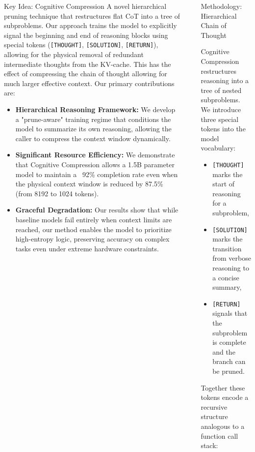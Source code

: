 \documentclass[final]{beamer}
\newlength{\sepwidth}
\newlength{\colwidth}
\newcommand{\separatorcolumn}{\begin{column}{\sepwidth}\end{column}}
\begin{document}
\begin{frame}[t]
\begin{columns}[t]
\begin{column}{\colwidth}
\begin{alertblock}{Key Idea: Cognitive Compression}
    A novel hierarchical pruning technique that restructures flat CoT into a tree of subproblems.
    Our approach trains the model to explicitly signal the beginning and end of reasoning blocks using special tokens (\texttt{[THOUGHT]}, \texttt{[SOLUTION]}, \texttt{[RETURN]}), allowing for the physical removal of redundant intermediate thoughts from the KV-cache. This has the effect of compressing the chain of thought allowing for much larger effective context.
    Our primary contributions are:
    \begin{itemize}
        \item \textbf{Hierarchical Reasoning Framework:} We develop a "prune-aware" training regime that conditions the model to summarize its own reasoning, allowing the caller to compress the context window dynamically.
        \item \textbf{Significant Resource Efficiency:} We demonstrate that Cognitive Compression allows a 1.5B parameter model to maintain a ~92\% completion rate even when the physical context window is reduced by 87.5\% (from 8192 to 1024 tokens).
        \item \textbf{Graceful Degradation:} Our results show that while baseline models fail entirely when context limits are reached, our method enables the model to prioritize high-entropy logic, preserving accuracy on complex tasks even under extreme hardware constraints.
    \end{itemize}

  \end{alertblock}

\end{column}

\separatorcolumn

\begin{column}{\colwidth}

  \begin{block}{Methodology: Hierarchical Chain of Thought}

    Cognitive Compression restructures reasoning into a tree of nested subproblems.
    We introduce three special tokens into the model vocabulary:
    \begin{itemize}
      \item \texttt{[THOUGHT]} marks the start of reasoning for a subproblem,
      \item \texttt{[SOLUTION]} marks the transition from verbose reasoning to a concise summary,
      \item \texttt{[RETURN]} signals that the subproblem is complete and the branch can be pruned.
    \end{itemize}
    Together these tokens encode a recursive structure analogous to a function call stack:
    

\end{block}
\end{column}
\end{columns}
\end{frame}
\end{document}
